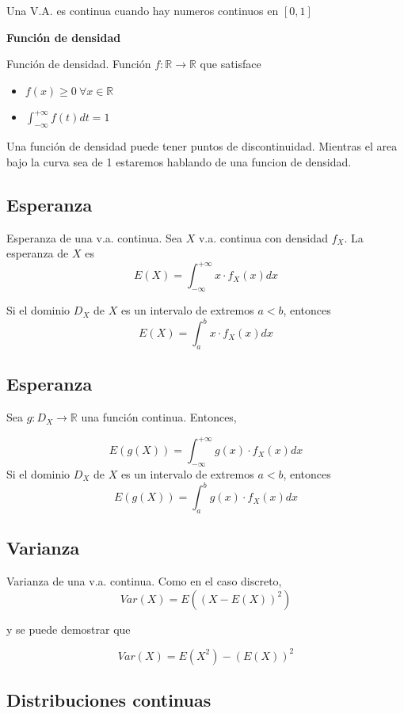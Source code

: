 \documentclass[
]{article}
\providecommand{\tightlist}{%
  \setlength{\itemsep}{0pt}\setlength{\parskip}{0pt}}
\begin{document}
Una V.A. es continua cuando hay numeros continuos en \([0,1]\)

\textbf{Función de densidad}

Función de densidad. Función \(f:\mathbb{R}\longrightarrow\mathbb{R}\)
que satisface

\begin{itemize}
\tightlist
\item
  \(f(x)\ge 0\ \forall x\in\mathbb{R}\)
\item
  \(\int_{-\infty}^{+\infty}f(t)dt=1\)
\end{itemize}

Una función de densidad puede tener puntos de discontinuidad. Mientras
el area bajo la curva sea de 1 estaremos hablando de una funcion de
densidad.

\hypertarget{esperanza-1}{%
\subsection{Esperanza}\label{esperanza-1}}

Esperanza de una v.a. continua. Sea \(X\) v.a. continua con densidad
\(f_X\). La esperanza de \(X\) es
\[E(X)=\int_{-\infty}^{+\infty}x\cdot f_X(x)dx\]

Si el dominio \(D_X\) de \(X\) es un intervalo de extremos \(a<b\),
entonces \[E(X)=\int_a^b x\cdot f_X(x)dx\]

\hypertarget{esperanza-2}{%
\subsection{Esperanza}\label{esperanza-2}}

Sea \(g:D_X\longrightarrow \mathbb{R}\) una función continua. Entonces,

\[E(g(X)) = \int_{-\infty}^{+\infty}g(x)\cdot f_X(x)dx\] Si el dominio
\(D_X\) de \(X\) es un intervalo de extremos \(a<b\), entonces
\[E(g(X))=\int_a^b g(x)\cdot f_X(x)dx\]

\hypertarget{varianza-1}{%
\subsection{Varianza}\label{varianza-1}}

Varianza de una v.a. continua. Como en el caso discreto,
\[Var(X)=E((X-E(X))^2)\]

y se puede demostrar que

\[Var(X)=E(X^2)-(E(X))^2\]

\hypertarget{distribuciones-continuas}{%
\subsection{Distribuciones continuas}\label{distribuciones-continuas}}
\end{document}
